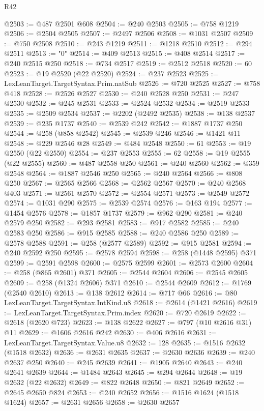 \begin{lexlean}{R42}
\begin{coremodule}
{@2503 := @487 @2501 @608
@2504 := @240 @2503
@2505 := @758 @1219
@2506 := @2504 @2505
@2507 := @2497 @2506
@2508 := @1031 @2507
@2509 := @750 @2508
@2510 := @243 @1219
@2511 := @1218 @2510
@2512 := @294 @2511
@2513 := "0"
@2514 := @409 @2513
@2515 := @408 @2514
@2517 := @240 @2515 @250
@2518 := @734 @2517
@2519 := @2512 @2518
@2520 := 60
@2523 := @19 @2520 (@22 @2520)
@2524 := @237 @2523
@2525 := LexLeanTarget.TargetSyntax.Prim.natSub
@2526 := @720 @2525
@2527 := @758 @418
@2528 := @2526 @2527
@2530 := @240 @2528 @250
@2531 := @247 @2530
@2532 := @245 @2531
@2533 := @2524 @2532
@2534 := @2519 @2533
@2535 := @2509 @2534
@2537 := @2202 (@2492 @2535)
@2538 := @138 @2537
@2539 := @235 @1737
@2540 := @2539 @242
@2542 := @1887 @1737 @250
@2544 := @258 (@858 @2542)
@2545 := @2539 @246
@2546 := @1421 @11
@2548 := @229 @2546 @28
@2549 := @484 @2548
@2550 := 61
@2553 := @19 @2550 (@22 @2550)
@2554 := @237 @2553
@2555 := 62
@2558 := @19 @2555 (@22 @2555)
@2560 := @487 @2558 @250
@2561 := @240 @2560
@2562 := @359 @2548
@2564 := @1887 @2546 @250
@2565 := @240 @2564
@2566 := @808 @250
@2567 := @2565 @2566
@2568 := @2562 @2567
@2570 := @240 @2568 @403
@2571 := @2561 @2570
@2572 := @2554 @2571
@2573 := @2549 @2572
@2574 := @1031 @290
@2575 := @2539 @2574
@2576 := @163 @194
@2577 := @1454 @2576
@2578 := @1857 @1737
@2579 := @962 @290
@2581 := @240 @2579 @250
@2582 := @293 @2581
@2583 := @917 @2582
@2585 := @240 @2583 @250
@2586 := @915 @2585
@2588 := @240 @2586 @250
@2589 := @2578 @2588
@2591 := @258 (@2577 @2589)
@2592 := @915 @2581
@2594 := @240 @2592 @250
@2595 := @2578 @2594
@2598 := @258 (@1448 @2595) @371
@2599 := @2591 @2598
@2600 := @2575 @2599
@2601 := @2573 @2600
@2604 := @258 (@865 @2601) @371
@2605 := @2544 @2604
@2606 := @2545 @2605
@2609 := @258 (@1324 @2606) @371
@2610 := @2544 @2609
@2612 := @1769 (@2540 @2610)
@2613 := @138 @2612
@2614 := @717 @66
@2616 := @80 LexLeanTarget.TargetSyntax.IntKind.u8
@2618 := @2614 (@1421 @2616)
@2619 := LexLeanTarget.TargetSyntax.Prim.index
@2620 := @720 @2619
@2622 := @2618 (@2620 @723)
@2623 := @138 @2622
@2627 := @797 (@10 @2616 @31) @11
@2629 := @1606 @2616 @242
@2630 := @406 @2616
@2631 := LexLeanTarget.TargetSyntax.Value.u8
@2632 := 128
@2635 := @1516 @2632 (@1518 @2632)
@2636 := @2631 @2635
@2637 := @2630 @2636
@2639 := @240 @2637 @250
@2640 := @245 @2639
@2641 := @1905 @2640
@2643 := @240 @2641 @2639
@2644 := @1484 @2643
@2645 := @294 @2644
@2648 := @19 @2632 (@22 @2632)
@2649 := @822 @2648
@2650 := @821 @2649
@2652 := @2645 @2650 @824
@2653 := @240 @2652
@2656 := @1516 @1624 (@1518 @1624)
@2657 := @2631 @2656
@2658 := @2630 @2657
}
\end{coremodule}
\end{lexlean}
